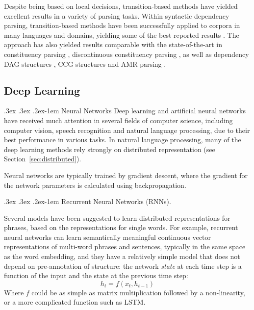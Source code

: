 \documentclass[12pt]{article}
\makeatletter
\newcommand{\secref}[1]{Section~\ref{#1}}
\renewcommand{\paragraph}{
  \@startsection{paragraph}{4}
  {\z@}{.3ex \@plus .3ex \@minus .2ex}{-1em}
  {\normalfont\normalsize\bfseries}
}
\makeatother
\begin{document}
Despite being based on local decisions, transition-based methods have yielded excellent
results in a variety of parsing tasks.
Within syntactic dependency parsing, transition-based methods
have been successfully applied to corpora in many languages and domains, yielding some
of the best reported results \cite{dyer2015transition,ballesteros2015improved}. 
The approach has also yielded results comparable with the state-of-the-art in
constituency parsing \cite{sagae2005classifier,zhang2009transition,zhu2013fast},
discontinuous constituency parsing \cite{maier2015discontinuous},
as well as dependency DAG structures
\cite{sagae2008shift,tokgoz2015transition}, CCG structures \cite{ambati2015incremental}
and AMR parsing \cite{wang2015transition}.


\subsection{Deep Learning}\label{sec:deep_learning}

\paragraph{Neural Networks}
Deep learning and artificial neural networks have received much attention in
several fields of computer science, including computer vision, speech
recognition and natural language processing, due to their best performance in
various tasks\cite{collobert2011nlp}.
In natural language processing, many of the deep learning methods rely strongly
on distributed representation (see \secref{sec:distributed}).

Neural networks are typically trained by gradient descent, where the gradient for the network parameters
is calculated using backpropagation.

\paragraph{Recurrent Neural Networks (RNNs).}

Several models have been suggested to learn distributed representations for
phrases, based on the representations for single words.
For example, recurrent neural networks can learn semantically meaningful
continuous vector representations of multi-word phrases and sentences,
typically in the same space as the word embedding, and they have a relatively
simple model that does not depend on pre-annotation of structure:
the network \textit{state} at each time step is a function of the input and
the state at the previous time step:
\[
  h_t=f(x_t,h_{t-1})
\]
Where $f$ could be as simple as matrix multiplication followed by a non-linearity,
or a more complicated function such as LSTM.
\end{document}
